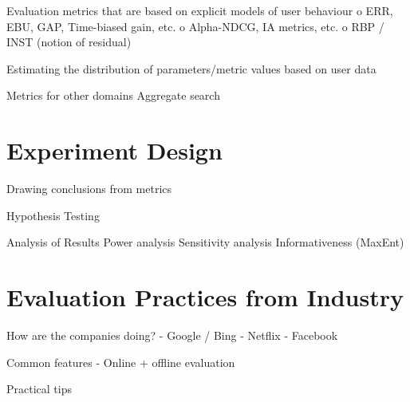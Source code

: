 \documentclass[openany]{now} %
\begin{document}
Evaluation metrics that are based on explicit models of user behaviour
o	ERR, EBU, GAP, Time-biased gain, etc.
o	Alpha-NDCG, IA metrics, etc.
o	RBP / INST (notion of residual)

Estimating the distribution of parameters/metric values based on user data

Metrics for other domains
Aggregate search \cite{Zhou:2013}

\chapter{Experiment Design}
Drawing conclusions from metrics

Hypothesis Testing
\cite{Dincer:2014}

Analysis of Results
Power analysis
Sensitivity analysis
Informativeness (MaxEnt)
\cite{Bron:2013} \cite{Urbano:2013} \cite{Boytsov:2013} \cite{Sakai:2014} \cite{Robertson:2012}



\chapter{Evaluation Practices from Industry}
How are the companies doing?
-	Google / Bing
-	Netflix \cite{gunawardana2015evaluating} \cite{Gomez-Uribe2015}
-	Facebook

Common features
- Online + offline evaluation

Practical tips


\backmatter  %



	
\end{document}
